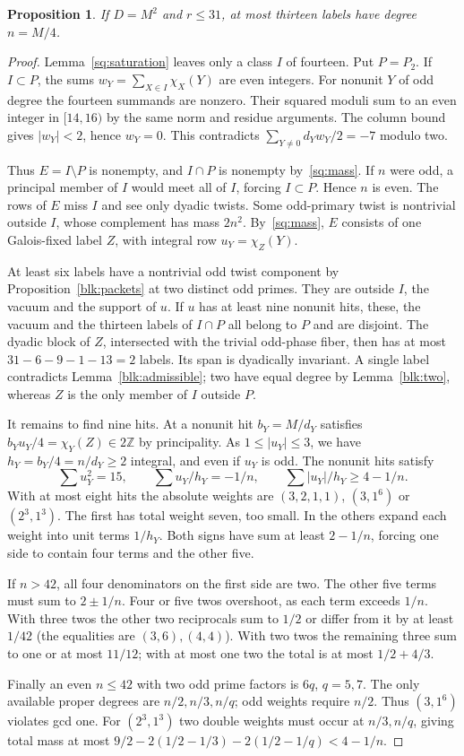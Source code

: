 \documentclass[11pt]{amsart}
\numberwithin{equation}{section}
\newtheorem{proposition}[theorem]{Proposition}
\begin{document}
\begin{proposition}\label{sq:fourteen}
If $D=M^2$ and $r\le31$, at most thirteen labels have degree $n=M/4$.
\end{proposition}
\begin{proof}
Lemma~\ref{sq:saturation} leaves only a class $I$ of fourteen. Put $P=P_2$. If $I\subset P$, the sums $w_Y=\sum_{X\in I}\chi_X(Y)$ are even integers. For nonunit $Y$ of odd degree the fourteen summands are nonzero. Their squared moduli sum to an even integer in $[14,16)$ by the same norm and residue arguments. The column bound gives $|w_Y|<2$, hence $w_Y=0$. This contradicts $\sum_{Y\ne0}d_Yw_Y/2=-7$ modulo two.

Thus $E=I\setminus P$ is nonempty, and $I\cap P$ is nonempty by~\eqref{sq:mass}. If $n$ were odd, a principal member of $I$ would meet all of $I$, forcing $I\subset P$. Hence $n$ is even. The rows of $E$ miss $I$ and see only dyadic twists. Some odd-primary twist is nontrivial outside $I$, whose complement has mass $2n^2$. By~\eqref{sq:mass}, $E$ consists of one Galois-fixed label $Z$, with integral row $u_Y=\chi_Z(Y)$.

At least six labels have a nontrivial odd twist component by Proposition~\ref{blk:packets} at two distinct odd primes. They are outside $I$, the vacuum and the support of $u$. If $u$ has at least nine nonunit hits, these, the vacuum and the thirteen labels of $I\cap P$ all belong to $P$ and are disjoint. The dyadic block of $Z$, intersected with the trivial odd-phase fiber, then has at most $31-6-9-1-13=2$ labels. Its span is dyadically invariant. A single label contradicts Lemma~\ref{blk:admissible}; two have equal degree by Lemma~\ref{blk:two}, whereas $Z$ is the only member of $I$ outside $P$.

It remains to find nine hits. At a nonunit hit $b_Y=M/d_Y$ satisfies $b_Yu_Y/4=\chi_Y(Z)\in2\mathbb Z$ by principality. As $1\le|u_Y|\le3$, we have $h_Y=b_Y/4=n/d_Y\ge2$ integral, and even if $u_Y$ is odd. The nonunit hits satisfy
\[
 \sum u_Y^2=15,\qquad \sum u_Y/h_Y=-1/n,\qquad
 \sum |u_Y|/h_Y\ge4-1/n.
\]
With at most eight hits the absolute weights are $(3,2,1,1)$, $(3,1^6)$ or $(2^3,1^3)$. The first has total weight seven, too small. In the others expand each weight into unit terms $1/h_Y$. Both signs have sum at least $2-1/n$, forcing one side to contain four terms and the other five.

If $n>42$, all four denominators on the first side are two. The other five terms must sum to $2\pm1/n$. Four or five twos overshoot, as each term exceeds $1/n$. With three twos the other two reciprocals sum to $1/2$ or differ from it by at least $1/42$ (the equalities are $(3,6),(4,4)$). With two twos the remaining three sum to one or at most $11/12$; with at most one two the total is at most $1/2+4/3$.

Finally an even $n\le42$ with two odd prime factors is $6q$, $q=5,7$. The only available proper degrees are $n/2,n/3,n/q$; odd weights require $n/2$. Thus $(3,1^6)$ violates gcd one. For $(2^3,1^3)$ two double weights must occur at $n/3,n/q$, giving total mass at most $9/2-2(1/2-1/3)-2(1/2-1/q)<4-1/n$.
\end{proof}
\end{document}
